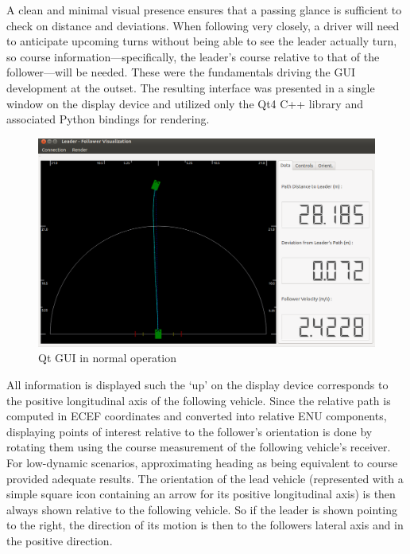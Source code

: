 \documentclass[twocolumn,10pt]{article}
\begin{document}
    A clean and minimal visual presence ensures that a passing glance is sufficient to check on distance and deviations.  When following very closely, a driver will need to anticipate upcoming turns without being able to see the leader actually turn, so course information---specifically, the leader's course relative to that of the follower---will be needed.  These were the fundamentals driving the GUI development at the outset.  The resulting interface was presented in a single window on the display device and utilized only the Qt4 C++ library \cite{qt} and associated Python bindings for rendering.

    \begin{figure}[ht] \centering
      \includegraphics[width=\columnwidth] {../graphics/final_design_data.png}
      \caption{Qt GUI in normal operation}
      \label{fig:qt_normal}
    \end{figure}

    All information is displayed such the `up' on the display device corresponds to the positive longitudinal axis of the following vehicle.
    Since the relative path is computed in ECEF coordinates and converted into relative ENU components, displaying points of interest relative to the follower's orientation is done by rotating them using the course measurement of the following vehicle's receiver. For low-dynamic scenarios, approximating heading as being equivalent to course provided adequate results.
    The orientation of the lead vehicle (represented with a simple square icon containing an arrow for its positive longitudinal axis) is then always shown relative to the following vehicle.  So if the leader is shown pointing to the right, the direction of its motion is then to the followers lateral axis and in the positive direction. 
\end{document}
